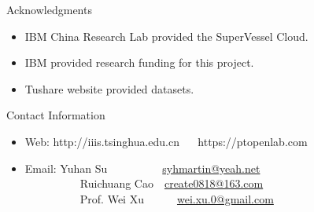 \documentclass[final,hyperref={pdfpagelabels=false}]{beamer}
\begin{document}
\begin{frame}[t]
\begin{columns}[t]
\begin{column}{.445\textwidth}
\begin{block}{Acknowledgments}

\begin{itemize}
\item IBM China Research Lab provided the SuperVessel Cloud. 
\item IBM provided research funding for this project.
\item Tushare website provided datasets. 
\end{itemize}

\end{block}



\begin{block}{Contact Information}

\begin{itemize}
\item Web: http://iiis.tsinghua.edu.cn ~~ https://ptopenlab.com \\


\item Email: Yuhan Su~~~~~~~~~~\href{mailto:syhmartin@yeah.ne}{syhmartin@yeah.net} \\ 
~~~~~~~~~~Ruichuang Cao~~\href{mailto:create0818@163.com}{create0818@163.com} \\
~~~~~~~~~~Prof. Wei Xu~~~~~~\href{mailto:wei.xu.0@gmail.com}{wei.xu.0@gmail.com}
\end{itemize}

\end{block}


\end{column} %

\begin{column}{.015\textwidth}\end{column} %

\end{columns} %

\end{frame} %
\end{document}
